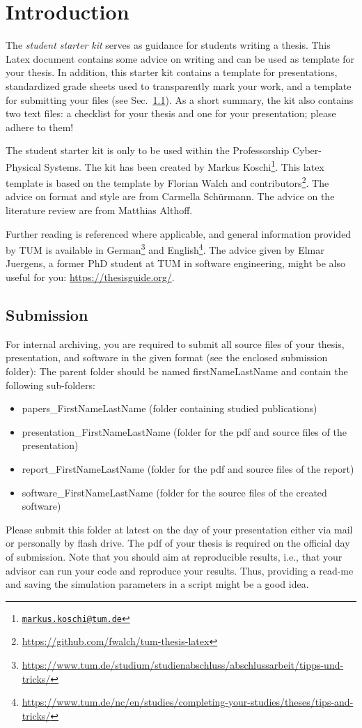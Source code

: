 \chapter{Introduction} \label{ch:intro}

The \textit{student starter kit} serves as guidance for students writing a thesis.
This Latex document contains some advice on writing and can be used as template for your thesis.
In addition, this starter kit contains a template for presentations, standardized grade sheets used to transparently mark your work, and a template
for submitting your files (see Sec.~\ref{sec:submission}).
As a short summary, the kit also contains two text files: a checklist for your thesis and one for your presentation; please adhere to them!

The student starter kit is only to be used within the Professorship Cyber-Physical Systems.
The kit has been created by Markus Koschi\footnote{\href{mailto:markus.koschi@tum.de}{\texttt{markus.koschi@tum.de}}}.
This latex template is based on the template by Florian Walch and contributors\footnote{\url{https://github.com/fwalch/tum-thesis-latex}}.
The advice on format and style are from Carmella Schürmann.
The advice on the literature review are from Matthias Althoff.

Further reading is referenced where applicable, and general information provided by TUM is available in
German\footnote{\url{https://www.tum.de/studium/studienabschluss/abschlussarbeit/tipps-und-tricks/}} and
English\footnote{\url{https://www.tum.de/nc/en/studies/completing-your-studies/theses/tips-and-tricks/}}.
The advice given by Elmar Juergens, a former PhD student at TUM in software engineering, might be also useful for you:
\url{https://thesisguide.org/}.

\section{Submission} \label{sec:submission}
For internal archiving, you are required to submit all source files of your thesis, presentation, and software in the given format (see the enclosed submission folder):
The parent folder should be named firstNameLastName and contain the following sub-folders:
\begin{itemize}
	\item papers\_FirstNameLastName (folder containing studied publications)
	\item presentation\_FirstNameLastName (folder for the pdf and source files of the presentation)
	\item report\_FirstNameLastName (folder for the pdf and source files of the report)
	\item software\_FirstNameLastName (folder for the source files of the created software)
\end{itemize}
Please submit this folder at latest on the day of your presentation either via mail or personally by flash drive.
The pdf of your thesis is required on the official day of submission.
Note that you should aim at reproducible results, i.e., that your advisor can run your code and reproduce your results.
Thus, providing a read-me and saving the simulation parameters in a script might be a good idea.


